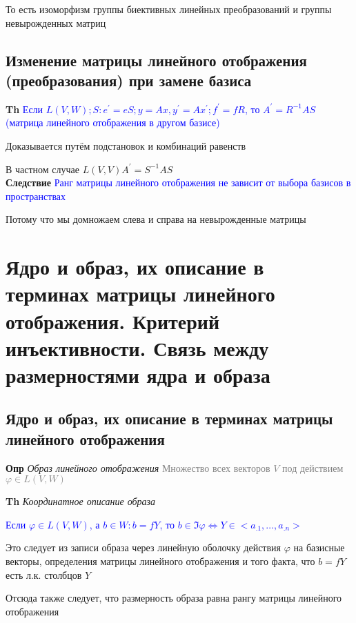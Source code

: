 \documentclass[a4paper, 14pt]{article}
\begin{document}
    То есть изоморфизм группы биективных линейных преобразований и группы невырожденных матриц

    \subsection{Изменение матрицы линейного отображения (преобразования) при замене базиса}

    \textbf{Th} \textcolor{blue}{Если $L(V, W); S: e^{'} = eS; y = Ax, y^{'} = Ax^{'}; f^{'} = fR$, то
        $A^{'} = R^{-1}AS$ (матрица линейного отображения в другом базисе)}

    Доказывается путём подстановок и комбинаций равенств

    В частном случае $L(V, V) A^{'} = S^{-1}AS$ \\

    \textbf{Следствие} \textcolor{blue}{Ранг матрицы линейного отображения не зависит от выбора базисов в
    пространствах}

    Потому что мы домножаем слева и справа на невырожденные матрицы

    \section{Ядро и образ, их описание в терминах матрицы линейного отображения.
    Критерий инъективности.
    Связь между размерностями ядра и образа}

    \subsection{Ядро и образ, их описание в терминах матрицы линейного отображения}

    \textbf{Опр} \textit{Образ линейного отображения} \textcolor{gray}{Множество всех векторов $V$ под
    действием $\varphi \in L(V, W)$}

    \textbf{Th} \textit{Координатное описание образа}

    \textcolor{blue}{Если $\varphi \in L(V, W)$, а $b \in W: b =
    fY$, то $b \in \Im \varphi \Leftrightarrow Y \in <a_{.1}, \dots, a_{.n}>$}

    Это следует из записи образа через линейную оболочку действия $\varphi$ на базисные векторы, определения матрицы
    линейного отображения и того факта, что $b = fY$ есть л.к. столбцов $Y$

    Отсюда также следует, что размерность образа равна рангу матрицы линейного отображения
\end{document}
